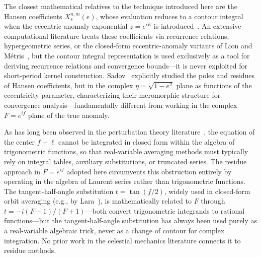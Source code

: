 The closest mathematical relatives to the technique introduced here are the
Hansen coefficients $X_s^{n,m}(e)$, whose evaluation reduces to a contour
integral when the eccentric anomaly exponential $z = e^{iE}$ is
introduced~\cite{giacaglia1976}.  An extensive computational literature
treats these coefficients via recurrence relations, hypergeometric series,
or the closed-form eccentric-anomaly variants of Lion and
M\'etris~\cite{lion2013}, but the contour integral representation is used
exclusively as a tool for deriving recurrence relations and convergence
bounds---it is never exploited for short-period kernel construction.
Sadov~\cite{sadov2008} explicitly studied the poles and residues of Hansen
coefficients, but in the complex $\eta = \sqrt{1-e^2}$ plane as functions
of the eccentricity parameter, characterizing their meromorphic structure
for convergence analysis---fundamentally different from working in the
complex $F = e^{if}$ plane of the true anomaly.

As has long been observed in the perturbation theory
literature~\cite{jefferys1971}, the equation of the center $f - \ell$
cannot be integrated in closed form within the algebra of trigonometric
functions, so that real-variable averaging methods must typically rely on
integral tables, auxiliary substitutions, or truncated series.  The residue approach in $F = e^{if}$
adopted here circumvents this obstruction entirely by operating in the
algebra of Laurent series rather than trigonometric functions.  The
tangent-half-angle substitution $t = \tan(f/2)$, widely used in
closed-form orbit averaging (e.g., by
Lara~\cite{lara2020}), is
mathematically related to $F$ through $t = -i(F-1)/(F+1)$---both convert
trigonometric integrands to rational functions---but the tangent-half-angle
substitution has always been used purely as a real-variable algebraic
trick, never as a change of contour for complex integration.  No prior
work in the celestial mechanics literature connects it to residue methods.

